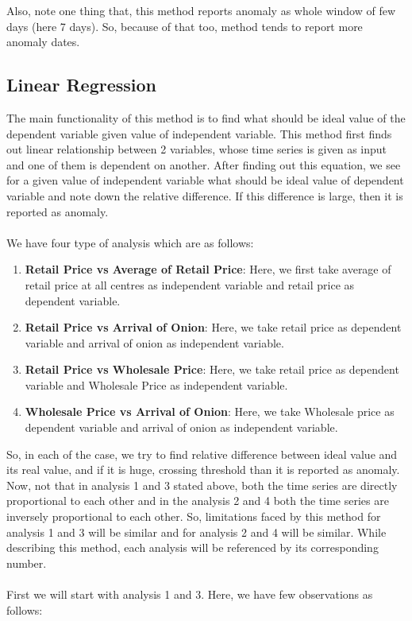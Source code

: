 \documentclass[a4paper,10pt]{report}
\begin{document}
	Also, note one thing that, this method reports anomaly as whole window of few days (here 7 days). So, because of that too, method tends to report more anomaly dates.


\subsection{Linear Regression}

		The main functionality of this method is to find what should be ideal value of the dependent variable given value of independent variable. This method first finds out linear relationship between 2 variables, whose time series is given as input and one of them is dependent on another. After finding out this equation, we see for a given value of independent variable what should be ideal value of dependent variable and note down the relative difference. If this difference is large, then it is reported as anomaly.\\
		\\
		We have four type of analysis which are as follows:
		\begin{enumerate}
			\item \textbf{Retail Price vs Average of Retail Price}: Here, we first take average of retail price at all centres as independent variable and retail price as dependent variable.			
			\item \textbf{Retail Price vs Arrival of Onion}: Here, we take retail price as dependent variable and arrival of onion as independent variable.
			\item \textbf{Retail Price vs Wholesale Price}: Here, we take retail price as dependent variable and Wholesale Price as independent variable.
			\item \textbf{Wholesale Price vs Arrival of Onion}: Here, we take Wholesale price as dependent variable and arrival of onion as independent variable.
		\end{enumerate}
		
		So, in each of the case, we try to find relative difference between ideal value and its real value, and if it is huge, crossing threshold than it is reported as anomaly. Now, not that in analysis 1 and 3 stated above, both the time series are directly proportional to each other and in the analysis 2 and 4 both the time series are inversely proportional to each other. So, limitations faced by this method for analysis 1 and 3 will be similar and for analysis 2 and 4 will be similar. While describing this method, each analysis will be referenced by its corresponding number.\\
		\\
		First we will start with analysis 1 and 3. Here, we have few observations as follows:
		
\end{document}

